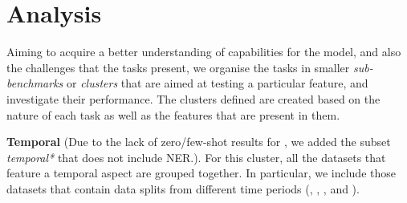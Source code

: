 \begin{table}[h]
\vspace{1em}
\begin{center}
\end{center}
\caption{Aggregated results over each test cluster of the best zero-shot, few-shot and fine-tuning methods.}
\label{tab:results_of_groups}
\end{table}


\section{Analysis}
Aiming to acquire a better understanding of capabilities for the model, and also the challenges that the tasks present, we organise the tasks in smaller \textit{sub-benchmarks} or \textit{clusters} that are aimed at testing a particular feature, and investigate their performance. The clusters defined are created based on the nature of each task as well as the features that are present in them.

\textbf{Temporal} (Due to the lack of zero/few-shot results for {\TweetNER}, we added the subset \textit{temporal*} that does not include NER.). For this cluster, all the datasets  that feature a temporal aspect are grouped together. In particular, we include those datasets that contain data splits from different time periods ({\TweetNER}, {\TempoWiC}, {\TweetTopic}, and {\TweetNERD}).
  
